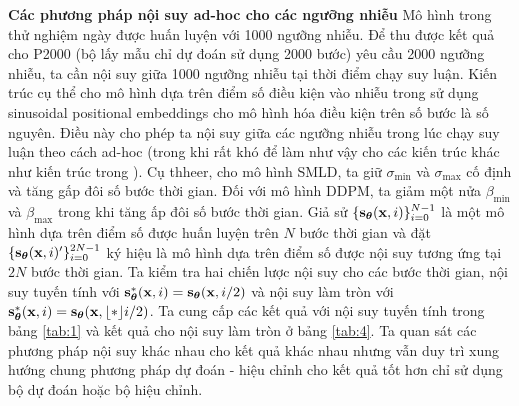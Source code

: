 \documentclass{article} %
\begin{document}
\textbf{Các phương pháp nội suy ad-hoc cho các ngưỡng nhiễu} Mô hình trong thử nghiệm ngày được huấn luyện với 1000 ngưỡng nhiễu.
Để thu được kết quả cho P2000 (bộ lấy mẫu chỉ dự đoán sử dụng 2000 bước) yêu cầu 2000 ngưỡng nhiễu,
ta cần nội suy giữa 1000 ngưỡng nhiễu tại thời điểm chạy suy luận.
Kiến trúc cụ thể cho mô hình dựa trên điểm số điều kiện vào nhiễu trong \citep{ho2020denoising} sử dụng sinusoidal positional embeddings cho mô hình hóa điều kiện trên số bước là số nguyên.
Điều này cho phép ta nội suy giữa các ngưỡng nhiễu trong lúc chạy suy luận theo cách ad-hoc (trong khi rất khó để làm như vậy cho các kiến trúc khác như kiến trúc trong \citep{song2019generative}).
Cụ thheer, cho mô hình SMLD, ta giữ $\sigma_{\min}$ và $\sigma_{\max}$ cố định và tăng gấp đôi số bước thời gian.
Đối với mô hình DDPM, ta giảm một nửa $\beta_{\min}$ và $\beta_{\max}$ trong khi tăng ấp đôi số bước thời gian.
Giả sử $\lbrace \bold{s}_{\boldsymbol{\theta}}(\bold{x}, i) \rbrace_{i=0}^{N-1}$ là một mô hình dựa trên điểm số được huấn luyện trên $N$ bước thời gian và đặt $\lbrace \bold{s}_{\boldsymbol{\theta}}(\bold{x}, i)^{\prime} \rbrace_{i=0}^{2N-1}$ ký hiệu là mô hình dựa trên điểm số được nội suy tương ứng tại $2N$ bước thời gian.
Ta kiểm tra hai chiến lược nội suy cho các bước thời gian, nội suy tuyến tính với $\bold{s}_{\boldsymbol{\theta}}^{\ast} (\bold{x}, i)= \bold{s}_{\boldsymbol{\theta}}(\bold{x}, i/2)$ và nội suy làm tròn với $\bold{s}_{\boldsymbol{\theta}}^{\ast} (\bold{x}, i)= \bold{s}_{\boldsymbol{\theta}}(\bold{x}, \lfloor * \rfloor{i/2})$.
Ta cung cấp các kết quả với nội suy tuyến tính trong bảng \ref{tab:1} và kết quả cho nội suy làm tròn ở bảng \ref{tab:4}.
Ta quan sát các phương pháp nội suy khác nhau cho kết quả khác nhau nhưng vẫn duy trì xung hướng chung phương pháp dự đoán - hiệu chỉnh cho kết quả tốt hơn chỉ sử dụng bộ dự đoán hoặc bộ hiệu chỉnh.
\end{document}

